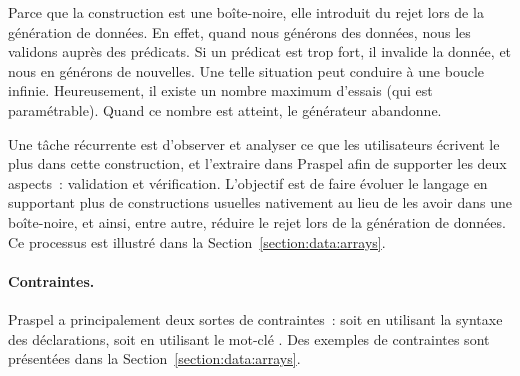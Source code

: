 Parce que la construction \apred{\empty} est une boîte-noire, elle introduit du
rejet lors de la génération de données. En effet, quand nous générons des
données, nous les validons auprès des prédicats. Si un prédicat est trop fort,
il invalide la donnée, et nous en générons de nouvelles. Une telle situation
peut conduire à une boucle infinie. Heureusement, il existe un nombre maximum
d'essais (qui est paramétrable). Quand ce nombre est atteint, le générateur
abandonne.

Une tâche récurrente est d'observer et analyser ce que les utilisateurs écrivent
le plus dans cette construction, et l'extraire dans Praspel afin de supporter
les deux aspects~: validation et vérification. L'objectif est de faire évoluer
le langage en supportant plus de constructions usuelles nativement au lieu de
les avoir dans une boîte-noire, et ainsi, entre autre, réduire le rejet lors de
la génération de données. Ce processus est illustré dans la
Section~\ref{section:data:arrays}.

\paragraph{Contraintes.} Praspel a principalement deux sortes de contraintes~:
soit en utilisant la syntaxe des déclarations, soit en utilisant le mot-clé
. Des exemples de contraintes sont présentées dans la
Section~\ref{section:data:arrays}.
